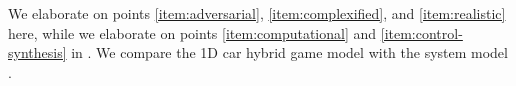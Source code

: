We elaborate on points \ref{item:adversarial}, \ref{item:complexified}, and \ref{item:realistic} here, while we elaborate on points \ref{item:computational} and \ref{item:control-synthesis} in .
We compare the 1D car hybrid game model  with the system model .













































